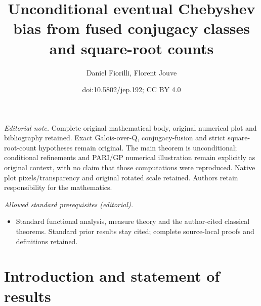 \documentclass[10pt]{amsart}
\title{Unconditional eventual Chebyshev bias from fused conjugacy classes and square-root counts}
\author{Daniel Fiorilli, Florent Jouve}
\date{doi:10.5802/jep.192; CC BY 4.0}
\theoremstyle{definition}
\providecommand{\mainmatter}{}\providecommand{\backmatter}{}
\begin{document}
\maketitle
\noindent\textit{Editorial note.} Complete original mathematical body, original numerical plot and bibliography retained. Exact Galois-over-Q, conjugacy-fusion and strict square-root-count hypotheses remain original. The main theorem is unconditional; conditional refinements and PARI/GP numerical illustration remain explicitly as original context, with no claim that those computations were reproduced. Native plot pixels/transparency and original rotated scale retained. Authors retain responsibility for the mathematics.\par\medskip
\noindent\textit{Allowed standard prerequisites (editorial).}\begin{itemize}
\item Standard functional analysis, measure theory and the author-cited classical theorems. Standard prior results stay cited; complete source-local proofs and definitions retained.
\end{itemize}\medskip
\tableofcontents
\mainmatter

\section{Introduction and statement of results}
\label{section intro}
\end{document}
